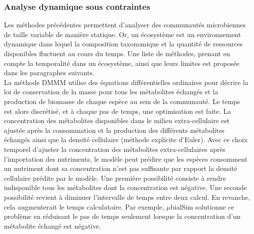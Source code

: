 \documentclass[../main.tex]{subfiles}
\begin{document}
\subsubsection{Analyse dynamique sous contraintes}
Les méthodes précédentes permettent d'analyser des communautés microbiennes de taille variable de manière statique. Or,  un écosystème est un environnement dynamique dans lequel la composition taxonomique et la quantité de ressources disponibles fluctuent au cours du temps. Une liste de méthodes, prenant en compte la temporalité dans un écosystème, ainsi que leurs limites est proposée dans les paragraphes suivants. \\

La méthode DMMM \citep{Zhuang2011} utilise des équations différentielles ordinaires pour décrire la loi de conservation de la masse pour tous les métabolites échangés et la production de biomasse de chaque espèce au sein de la communauté. Le temps est alors discrétisé, et à chaque pas de temps, une optimisation est faite. La concentration des métabolites disponibles dans le milieu extra-cellulaire est ajustée après la consommation et la production des différents métabolites échangés ainsi que la densité cellulaire (méthode explicite d'Euler). Avec ce choix temporel d'ajuster la concentration des métabolites extra-cellulaires après l'importation des nutriments, le modèle peut prédire que les espèces consomment un nutriment dont sa concentration n'est pas suffisante par rapport la densité cellulaire prédite par le modèle. Une première possibilité consiste à rendre indisponible tous les métabolites dont la concentration est négative. Une seconde possibilité revient à diminuer l'intervalle de temps entre deux calcul. En revanche, cela augmenterait le temps calculatoire.  Par exemple, $\mu$bialSim \citep{Popp2020} solutionne ce problème en réduisant le pas de temps seulement lorsque la concentration d'un métabolite échangé est négative.  \\
\end{document}
